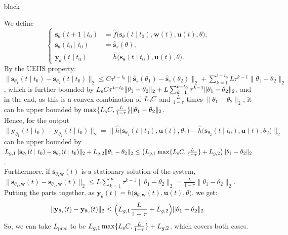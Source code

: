 \documentclass{ifacconf}
\def\rs{{\textnormal{s}}}
\def\rvu{{\mathbf{i}}}
\def\rvs{{\mathbf{s}}}
\def\rvu{{\mathbf{u}}}
\def\rvw{{\mathbf{w}}}
\def\rvy{{\mathbf{y}}}
\def\vs{{\bm{s}}}
\begin{document}
\begin{color}{black}
\begin{pf}
We define
\setlength{\abovedisplayskip}{4pt}%
\setlength{\belowdisplayskip}{4pt}%
\[
\left\{
\begin{aligned}
  \rvs_{\theta}(t+1 \mid t_0) &= \hat{f}\bigl(\rvs_{\theta}(t \mid t_0),\rvw(t),\rvu(t),\theta\bigr),\\
  \rvs_{\theta}(t_0 \mid t_0) &= \hat{\vs}_s(\theta),\\
  \rvy_{\theta}(t \mid t_0) &= \hat{h}\bigl(\rvs_{\theta}(t \mid t_0),\rvu(t),\theta\bigr).
\end{aligned}
\right.
\]
By the UEIIS property: $\|\rvs_{\theta_1}(t \mid t_0)- \rvs_{\theta_2}(t \mid t_0)\|_{2} \le C \tau^{t-t_0} \|\hat{\vs}_s(\theta_1)- \hat{\vs}_s(\theta_2)\|_{2} + \sum_{k=1}^{t-t_0}L\tau^{k-1}\|\theta_1 - \theta_2\|_{2}$, which is further bounded by $L_{\rs} C \tau^{t-t_0} \|\theta_1-\theta_2\|_{2} + L \sum_{k=1}^{t-t_0}\tau^{k-1}\|\theta_1 - \theta_2\|_{2}$, and in the end, as this is a convex combination of $L_{\rs}C$ and $\frac{L}{1-\tau}$ times $\|\theta_1-\theta_2\|_{2}$, it can be upper bounded by $\max\{L_{\rs} C, \frac{L}{1- \tau}\} \|\theta_1-\theta_2\|_{2}$.
\\ Hence, for the output $\| \rvy_{\theta_1}(t \mid t_0)- \rvy_{\theta_2}(t \mid t_0) \|_{2} = \| \hat{h}\bigl(\rvs_{\theta_1}(t \mid t_0),\rvu(t),\theta_1\bigr) - \hat{h}\bigl(\rvs_{\theta_2}(t \mid t_0),\rvu(t),\theta_2\bigr) \|_{2}$ can be upper bounded by $L_{g,1} \|\rvs_{\theta_1}(t \mid t_0)- \rvs_{\theta_2}(t \mid t_0)\|_{2} + L_{g,2}  \|\theta_1-\theta_2\|_{2} \le \bigl(L_{g,1}\max\{L_{\rs} C, \frac{L}{1- \tau}\}+L_{g,2}\bigr)\|\theta_1- \theta_2\|_{2}$.\\
Furthermore, if $\rvs_{\theta, \rvw}(t)$ is a stationary solution of the system, $ \|\rvs_{\theta_1, \rvw}(t)- \rvs_{\theta_2,\rvw}(t)\|_{2} \le L \sum_{k=1}^{\infty} \tau^{k-1}\|\theta_1 - \theta_2\|_{2} = \frac{L}{1-\tau}\|\theta_1 - \theta_2\|_{2} $.\\
Putting the parts together, as $\rvy_{\theta}(t) = \hat{h}\bigl(\rvs_{\theta,\rvw }(t),\rvu(t),\theta\bigr)$, we get:
\[
\| \rvy_{\theta_1}(t) - \rvy_{\theta_2}(t) \|_{2}
\le \Bigl( L_{g,1} \frac{L}{1-\tau} + L_{g,2} \Bigr) \|\theta_1 - \theta_2\|_{2}.
\]
So, we can take $L_{\mathrm{pred}}$ to be $ L_{g,1} \max\{L_{\rs} C, \frac{L}{1-\tau}\} + L_{g,2} $, which covers both cases.
\end{pf}
\end{color}
\end{document}
